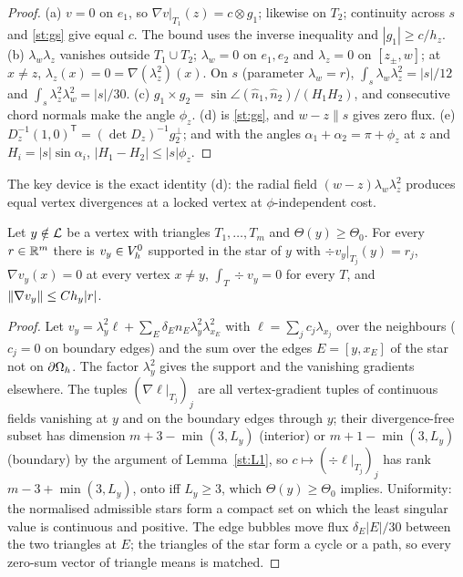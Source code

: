 \begin{proof}
(a) $v=0$ on $e_1$, so $\nabla v|_{T_1}(z)=c\otimes g_1$; likewise on $T_2$; continuity across $s$ and \eqref{st:gs} give equal $c$. The bound uses the inverse inequality and $|g_1|\ge c/h_z$. (b) $\lambda_w\lambda_z$ vanishes outside $T_1\cup T_2$; $\lambda_w=0$ on $e_1,e_2$ and $\lambda_z=0$ on $[z_\pm,w]$; at $x\ne z$, $\lambda_z(x)=0=\nabla(\lambda_z^2)(x)$. On $s$ (parameter $\lambda_w=r$), $\int_s\lambda_w\lambda_z^2=|s|/12$ and $\int_s\lambda_z^2\lambda_w^2=|s|/30$. (c) $g_1\times g_2=\sin\angle(\hat n_1,\hat n_2)/(H_1H_2)$, and consecutive chord normals make the angle $\phi_z$. (d) is \eqref{st:gs}, and $w-z\parallel s$ gives zero flux. (e) $D_z^{-1}(1,0)^{\mathsf T}=(\det D_z)^{-1}g_2^\perp$; and with the angles $\alpha_1+\alpha_2=\pi+\phi_z$ at $z$ and $H_i=|s|\sin\alpha_i$, $|H_1-H_2|\le|s|\phi_z$.
\end{proof}

The key device is the exact identity (d): the radial field $(w-z)\lambda_w\lambda_z^2$ produces equal vertex divergences at a locked vertex at $\phi$-independent cost.

\begin{lemma}\label{st:V}
Let $y\notin\mathcal L$ be a vertex with triangles $T_1,\dots,T_m$ and $\Theta(y)\ge\Theta_0$. For every $r\in\mathbb R^m$ there is $v_y\in V_h^0$ supported in the star of $y$ with $\div v_y|_{T_j}(y)=r_j$, $\nabla v_y(x)=0$ at every vertex $x\ne y$, $\int_T\div v_y=0$ for every $T$, and $\lVert \nabla v_y\rVert\le Ch_y|r|$.
\end{lemma}

\begin{proof}
Let $v_y=\lambda_y^2\ell+\sum_E\delta_En_E\lambda_y^2\lambda_{x_E}^2$ with $\ell=\sum_jc_j\lambda_{x_j}$ over the neighbours ($c_j=0$ on boundary edges) and the sum over the edges $E=[y,x_E]$ of the star not on $\partial\Omega_h$. The factor $\lambda_y^2$ gives the support and the vanishing gradients elsewhere. The tuples $(\nabla\ell|_{T_j})_j$ are all vertex-gradient tuples of continuous fields vanishing at $y$ and on the boundary edges through $y$; their divergence-free subset has dimension $m+3-\min(3,L_y)$ (interior) or $m+1-\min(3,L_y)$ (boundary) by the argument of Lemma~\ref{st:L1}, so $c\mapsto(\div\ell|_{T_j})_j$ has rank $m-3+\min(3,L_y)$, onto iff $L_y\ge3$, which $\Theta(y)\ge\Theta_0$ implies. Uniformity: the normalised admissible stars form a compact set on which the least singular value is continuous and positive. The edge bubbles move flux $\delta_E|E|/30$ between the two triangles at $E$; the triangles of the star form a cycle or a path, so every zero-sum vector of triangle means is matched.
\end{proof}

